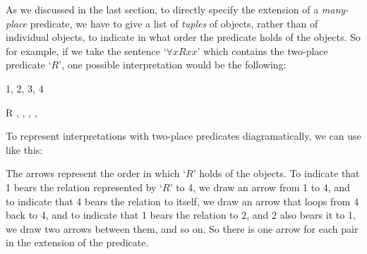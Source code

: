 As we discussed in the last section, to directly specify the extension of a \emph{many-place} predicate, we have to give a list of \emph{tuples} of objects, rather than of individual objects, to indicate in what order the predicate holds of the objects.  So for example, if we take the sentence `$\forall xRxx$' which contains the two-place predicate `$R$', one possible interpretation would be the following:
	\begin{ekey}
		\item[\text{Domain}] 1, 2, 3, 4
		\item[R], ,  ,  ,
	\end{ekey}
To represent interpretations with two-place predicates diagramatically, we can use  like this:
\begin{center}
\end{center}
The arrows represent the order in which `$R$' holds of the objects.  To indicate that 1 bears the relation represented by `$R$' to 4, we draw an arrow from 1 to 4, and to indicate that 4 bears the relation to itself, we draw an arrow that loops from 4 back to 4, and to indicate that 1 bears the relation to 2, and 2 also bears it to 1, we draw two arrows between them, and so on.  So there is one arrow for each pair in the extension of the predicate.



